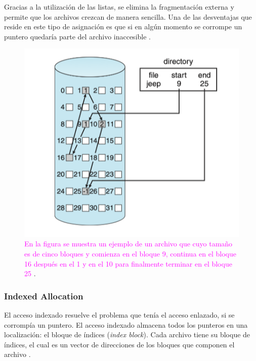 Gracias a la utilización de las listas, se elimina la fragmentación externa y permite que los archivos crezcan de manera sencilla. Una de las desventajas que reside en este tipo de asignación es que si en algún momento se corrompe un puntero quedaría parte del archivo inaccesible \cite{silberchatz}.

\begin{figure}[H]
    \centering
    \includegraphics[scale=0.6]{doc/assets/images/Allocation Methods/linked.png}
    \caption{\textcolor{magenta}{ En la figura se muestra un ejemplo de un archivo que cuyo tamaño es de cinco bloques y comienza en el bloque 9, continua en el bloque 16 después en el 1 y en el 10 para finalmente terminar en el bloque 25}  \cite{silberchatz}.}
    \label{fig:my_label}
\end{figure}

\subsubsection{Indexed Allocation}
El acceso indexado resuelve el problema que tenía el acceso enlazado, si se corrompía un puntero. El acceso indexado almacena todos los punteros en una localización: el bloque de índices (\textit{index block}). 
Cada archivo tiene su bloque de índices, el cual es un vector de direcciones de los bloques que componen el archivo \cite{silberchatz}.


